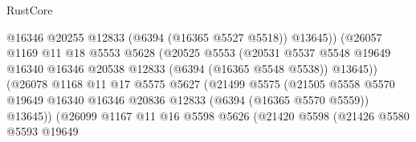 \begin{lexlean}{RustCore}
\begin{coremodule}
                                        @16346
                                        @20255
                                        @12833
                                        (@6394 (@16365 @5527 @5518))
                                        @13645))
                                    (@26057
                                      @1169
                                      @11
                                      @18
                                      @5553
                                      @5628
                                      (@20525
                                        @5553
                                        (@20531
                                          @5537
                                          @5548
                                          @19649
                                          @16340
                                          @16346
                                          @20538
                                          @12833
                                          (@6394 (@16365 @5548 @5538))
                                          @13645))
                                      (@26078
                                        @1168
                                        @11
                                        @17
                                        @5575
                                        @5627
                                        (@21499
                                          @5575
                                          (@21505
                                            @5558
                                            @5570
                                            @19649
                                            @16340
                                            @16346
                                            @20836
                                            @12833
                                            (@6394 (@16365 @5570 @5559))
                                            @13645))
                                        (@26099
                                          @1167
                                          @11
                                          @16
                                          @5598
                                          @5626
                                          (@21420
                                            @5598
                                            (@21426
                                              @5580
                                              @5593
                                              @19649

\end{coremodule}
\end{lexlean}
